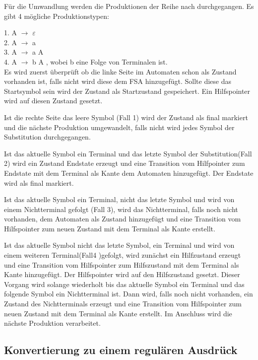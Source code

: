 Für die Umwandlung werden die Produktionen der Reihe nach durchgegangen.
Es gibt 4 mögliche Produktionstypen:

1. A $\rightarrow$ $\varepsilon$ \\
2. A $\rightarrow$ a\\
3. A $\rightarrow$ a A\\
4. A $\rightarrow$ b A , wobei b eine Folge von Terminalen ist.\\

Es wird zuerst überprüft ob die linke Seite im Automaten schon als Zustand
vorhanden ist, falls nicht wird diese dem FSA hinzugefügt. Sollte diese das
Startsymbol sein wird der Zustand als Startzustand gespeichert. Ein Hilfspointer wird
auf diesen Zustand gesetzt.

Ist die rechte Seite das leere Symbol (Fall 1) wird der Zustand als final
markiert und die nächste Produktion umgewandelt, falls nicht wird jedes Symbol
der Substitution durchgegangen.

Ist das aktuelle Symbol ein Terminal und das letzte Symbol der Substitution(Fall 2)
wird ein Zustand Endstate erzeugt und eine Transition vom Hilfpointer zum Endstate
mit dem Terminal als Kante dem Automaten hinzugefügt. Der Endstate wird als
final markiert.

Ist das aktuelle Symbol ein Terminal, nicht das letzte Symbol und wird von einem
Nichtterminal gefolgt (Fall 3), wird das Nichtterminal, falls noch nicht vorhanden,
dem Automaten als Zustand hinzugefügt und eine Transition vom Hilfspointer zum
neuen Zustand mit dem Terminal als Kante erstellt.

Ist das aktuelle Symbol nicht das letzte Symbol, ein Terminal und wird von einem
weiteren Terminal(Fall4 )gefolgt, wird zunächst ein Hilfzustand erzeugt und eine
Transition vom Hilfspointer zum Hilfszustand mit dem Terminal als Kante
hinzugefügt. Der Hilfspointer wird auf den Hilfszustand gesetzt. Dieser Vorgang wird
solange wiederholt bis das aktuelle Symbol ein Terminal und das folgende Symbol ein
Nichtterminal ist. Dann wird, falls noch nicht vorhanden, ein Zustand des
Nichtterminals erzeugt und eine Transition vom Hilfspointer zum neuen Zustand mit
dem Terminal als Kante erstellt. Im Anschluss wird die nächste Produktion
verarbeitet.

\subsection{Konvertierung zu einem regulären Ausdrück}

